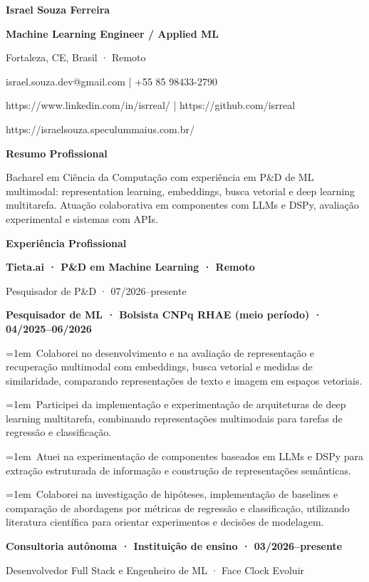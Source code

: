 \documentclass[a4paper,10pt]{article}
\begin{document}
\textbf{Israel Souza Ferreira}\par
\textbf{Machine Learning Engineer / Applied ML}\par
Fortaleza, CE, Brasil · Remoto\par
israel.souza.dev@gmail.com | +55 85 98433-2790\par
https://www.linkedin.com/in/isrreal/ | https://github.com/isrreal\par
https://israelsouza.speculummaius.com.br/\par
\vspace{5pt}\textbf{Resumo Profissional}\par
Bacharel em Ciência da Computação com experiência em P\&D de ML multimodal: representation learning, embeddings, busca vetorial e deep learning multitarefa. Atuação colaborativa em componentes com LLMs e DSPy, avaliação experimental e sistemas com APIs.\par
\vspace{5pt}\textbf{Experiência Profissional}\par
\textbf{Tieta.ai · P\&D em Machine Learning · Remoto}\par
Pesquisador de P\&D · 07/2026–presente\par
\textbf{Pesquisador de ML · Bolsista CNPq RHAE (meio período) · 04/2025–06/2026}\par
\hangindent=1em\textbullet\ Colaborei no desenvolvimento e na avaliação de representação e recuperação multimodal com embeddings, busca vetorial e medidas de similaridade, comparando representações de texto e imagem em espaços vetoriais.\par
\hangindent=1em\textbullet\ Participei da implementação e experimentação de arquiteturas de deep learning multitarefa, combinando representações multimodais para tarefas de regressão e classificação.\par
\hangindent=1em\textbullet\ Atuei na experimentação de componentes baseados em LLMs e DSPy para extração estruturada de informação e construção de representações semânticas.\par
\hangindent=1em\textbullet\ Colaborei na investigação de hipóteses, implementação de baselines e comparação de abordagens por métricas de regressão e classificação, utilizando literatura científica para orientar experimentos e decisões de modelagem.\par
\textbf{Consultoria autônoma · Instituição de ensino · 03/2026–presente}\par
Desenvolvedor Full Stack e Engenheiro de ML · Face Clock Evoluir\par
\end{document}
